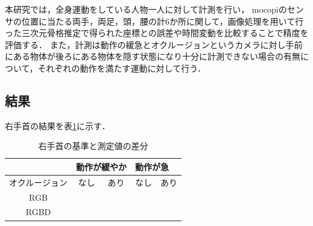 \documentclass[titlepage]{jarticle}
\begin{document}
本研究では，全身運動をしている人物一人に対して計測を行い，
mocopiのセンサの位置に当たる両手，両足，頭，腰の計6か所に関して，画像処理を用いて行った三次元骨格推定で得られた座標との誤差や時間変動を比較することで精度を評価する．
また，計測は動作の緩急とオクルージョンというカメラに対し手前にある物体が後ろにある物体を隠す状態になり十分に計測できない場合の有無について，それぞれの動作を満たす運動に対して行う．
%
%
\subsection{結果}
%
右手首の結果を表\ref{righthand}に示す．

\begin{table}[b!]
  \centering
  \caption{右手首の基準と測定値の差分}
  \begin{tabular}{c||c|c|c|c}
            & \multicolumn{2}{l}{動作が緩やか} & \multicolumn{2}{l}{動作が急}           \\\hline
    オクルージョン & なし                         & あり                       & なし & あり \\\hline\hline
    RGB     &                            &                          &    &    \\
    RGBD    &                            &                          &    &    \\\hline
  \end{tabular}
  \label{righthand}
\end{table}
%
%
%
%
%
\end{document}
